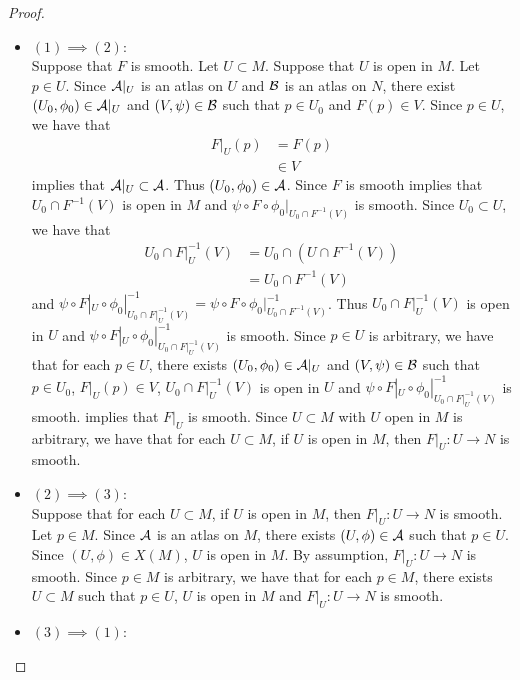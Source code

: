 \documentclass{book}
\begin{document}
\begin{proof} \
	\begin{itemize}
		\item $(1) \implies (2)$: \\
		Suppose that $F$ is smooth. Let $U \subset M$. Suppose that $U$ is open in $M$. Let $p \in U$. Since $\mathcal{A}|_U$ is an atlas on $U$ and $\mathcal{B}$ is an atlas on $N$, there exist $(U_0, \phi_0) \in \mathcal{A}|_U$ and $(V, \psi) \in \mathcal{B}$ such that $p \in U_0$ and $F(p) \in V$. Since $p \in U$, we have that 
		\begin{align*}
			F|_U(p) 
			& = F(p) \\
			& \in V
		\end{align*}
		 implies that $\mathcal{A}|_U \subset \mathcal{A}$. Thus $(U_0, \phi_0) \in \mathcal{A}$. Since $F$ is smooth  implies that $U_0 \cap F^{-1}(V)$ is open in $M$ and $\psi \circ F \circ \phi_0|_{U_0 \cap F^{-1}(V)}$ is smooth. Since $U_0 \subset U$, we have that 
		\begin{align*}
			U_0 \cap F|_U^{-1}(V) 
			& = U_0 \cap (U \cap F^{-1}(V))  \\
			& = U_0 \cap F^{-1}(V)
		\end{align*}
		and $\psi \circ F|_U \circ \phi_0|_{U_0 \cap F|_U^{-1}(V)}^{-1} = \psi \circ F \circ \phi_0|_{U_0 \cap F^{-1}(V)}^{-1}$. Thus $U_0 \cap F|_U^{-1}(V)$ is open in $U$ and $\psi \circ F|_U \circ \phi_0|_{U_0 \cap F|_U^{-1}(V)}^{-1}$ is smooth. Since $p \in U$ is arbitrary, we have that for each $p \in U$, there exists $(U_0, \phi_0) \in \mathcal{A}|_U$ and $(V, \psi) \in \mathcal{B}$ such that $p \in U_0$, $F|_U(p) \in V$, $U_0 \cap F|_U^{-1}(V)$ is open in $U$ and $\psi \circ F|_U \circ \phi_0|_{U_0 \cap F|_U^{-1}(V)}^{-1}$ is smooth.  implies that $F|_U$ is smooth. Since $U \subset M$ with $U$ open in $M$ is arbitrary, we have that for each $U \subset M$, if $U$ is open in $M$, then $F|_U: U \rightarrow N$ is smooth.
		\item  $(2) \implies (3)$: \\
		Suppose that for each $U \subset M$, if $U$ is open in $M$, then $F|_U: U \rightarrow N$ is smooth. Let $p \in M$. Since $\mathcal{A}$ is an atlas on $M$, there exists $(U, \phi) \in \mathcal{A}$ such that $p \in U$. Since $(U, \phi) \in X(M)$, $U$ is open in $M$. By assumption, $F|_U:U \rightarrow N$ is smooth. Since $p \in M$ is arbitrary, we have that for each $p \in M$, there exists $U \subset M$ such that $p \in U$, $U$ is open in $M$ and $F|_U: U \rightarrow N$ is smooth.  
		\item  $(3) \implies (1)$: \\

\end{itemize}
\end{proof}
\end{document}
